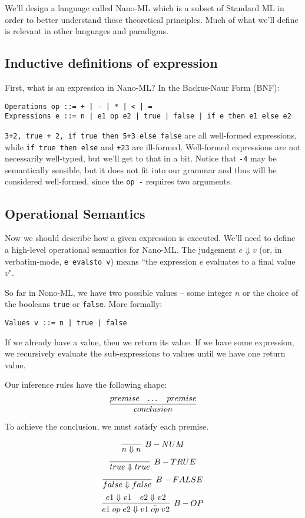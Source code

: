 \documentclass[11pt]{article}
\begin{document}
We'll design a language called Nano-ML which is a subset of Standard ML in order to better understand these theoretical principles. Much of what we'll define is relevant in other languages and paradigms.

\subsection{Inductive definitions of expression}
First, what is an expression in Nano-ML? In the Backus-Naur Form (BNF):
\begin{verbatim}
Operations op ::= + | - | * | < | =
Expressions e ::= n | e1 op e2 | true | false | if e then e1 else e2
\end{verbatim}

\verb~3+2, true + 2, if true then 5+3 else false~ are all well-formed expressions, while \verb~if true then else~ and \verb~+23~ are ill-formed. Well-formed expressions are not necessarily well-typed, but we'll get to that in a bit. Notice that \verb~-4~ may be semantically sensible, but it does not fit into our grammar and thus will be considered well-formed, since the \verb~op -~ requires two arguments.

\subsection{Operational Semantics}
Now we should describe how a given expression is executed. We'll need to define a high-level operational semantics for Nano-ML. The judgement $e \Downarrow v$ (or, in verbatim-mode, \verb~e evalsto v~) means ``the expression $e$ evaluates to a final value $v$". 

So far in Nono-ML, we have two possible values -- some integer $n$ or the choice of the booleans \verb~true~ or \verb~false~. More formally:
\begin{verbatim}
Values v ::= n | true | false
\end{verbatim}

If we already have a value, then we return its value. If we have some expression, we recursively evaluate the sub-expressions to values until we have one return value.  

Our inference rules have the following shape:
\[
\infer{conclusion}{
    premise
    &
    \dots
    &
    premise
}
\]

To achieve the conclusion, we must satisfy each premise.

\[
    \infer[B-NUM]{n \Downarrow n}{}
\]
\[
    \infer[B-TRUE]{true \Downarrow true}{}
\]
\[
    \infer[B-FALSE]{false \Downarrow false}{}
\]
\[
    \infer[B-OP]{ e1 \; op \; e2 \Downarrow \bar{v1 \; op \; v2}}{
        e1 \Downarrow v1
        &
        e2 \Downarrow v2
    }
\]
\end{document}

